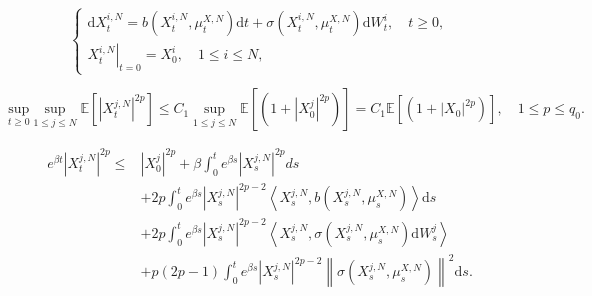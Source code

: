 \documentclass[10pt,a4paper]{amsart}
\begin{document}
\begin{equation}\tag{3.1}\label{interacting}
    \left\{\begin{array}{l}
\mathrm{d} X_t^{i, N}=b\left(X_t^{i, N}, \mu_t^{X, N}\right) \mathrm{d} t+\sigma\left(X_t^{i, N}, \mu_t^{X, N}\right) \mathrm{d} W_t^i, \quad t \geq 0, \\
\left.X_t^{i, N}\right|_{t=0}=X_0^i, \quad 1 \leq i \leq N,
\end{array}\right.
\end{equation}

\begin{equation}\tag{3.5}\label{3.25}
\underset{t\geqslant 0}{\mathrm{sup}}\underset{1\leqslant j\leqslant N}{\sup} \mathbb{E}\left[\left|X^{j,N}_{t}\right|^{2 p}\right] \leq C_1\underset{1\leqslant j\leqslant N}{\sup} \mathbb{E}\left[\left(1+\left|X_0^{j}\right|^{2 p}\right)\right]=C_1\mathbb{E}\left[\left(1+\left|X_0\right|^{2 p}\right)\right], \quad 1 \leq p \leq q_0.
\end{equation}

\begin{equation}\tag{5.19}\label{3.27}
\begin{aligned}
e^{\beta t}\left|X^{j,N}_{t}\right|^{2p} \leq & \left|X^j_0\right|^{2p}+\beta \int_0^t{e^{\beta s}\left|X^{j,N}_{s}\right|^{2p}ds}\\
&+2p \int_0^t{e^{\beta s}}\left|X^{j,N}_{s}\right|^{2p-2}\left\langle X^{j,N}_{s}, b\left( X^{j,N}_{s} ,\mu _{s}^{X,N} \right) 
\right\rangle \mathrm{d} s \\
& +2p \int_0^t{e^{\beta s}}\left|X^{j,N}_{s}\right|^{2p-2}\left\langle X^{j,N}_{s}, \sigma\left( X^{j,N}_{s} ,\mu _{s}^{X,N} \right)  \mathrm{d} W_s^j\right\rangle \\
& +p\left(2 p-1\right) \int_0^t{e^{\beta s}}\left|X^{j,N}_{s}\right|^{2p-2}\left\|\sigma\left( X^{j,N}_{s} ,\mu _{s}^{X,N} \right) \right\|^2 \mathrm{d} s.
\end{aligned}
\end{equation}
\end{document}
